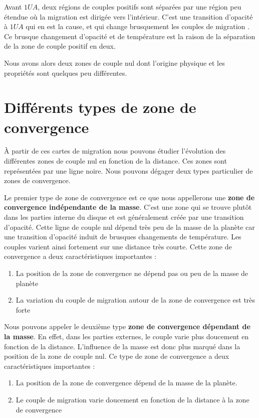 \bigskip

Avant $1\unit{UA}$, deux régions de couples positifs sont séparées par une région peu étendue où la migration est dirigée vers l'intérieur. C'est une transition d'opacité à $1\unit{UA}$ qui
en est la cause, et qui change brusquement les couples de migration . Ce
brusque changement d'opacité et de température est la raison de la séparation de la zone de couple positif en deux. 

Nous avons alors deux zones de couple nul dont l'origine physique et les propriétés sont quelques peu différentes. 

\section{Différents types de zone de convergence}\label{sec:CZ-types}
À partir de ces cartes de migration nous pouvons étudier l'évolution des différentes zones de couple nul en fonction de la
distance. Ces zones sont représentées par une ligne noire. Nous pouvons dégager deux types particulier de zones de convergence. 

Le premier type de zone de convergence est ce que nous appellerons une \textbf{zone de convergence indépendante de la masse}. C'est une
zone qui se trouve plutôt dans les parties interne du disque et est généralement créée par une transition d'opacité. Cette ligne de couple nul dépend très peu de la masse de la
planète car une transition d'opacité induit de brusques changements de température. Les couples varient ainsi fortement sur une
distance très courte. Cette zone de convergence a deux caractéristiques importantes : 
\begin{enumerate}
\item La position de la zone de convergence ne dépend pas ou peu de la masse de planète
\item La variation du couple de migration autour de la zone de convergence est très forte
\end{enumerate}

Nous pouvons appeler le deuxième type \textbf{zone de convergence dépendant de la masse}. En effet, dans les parties externes, le
couple varie plus doucement en fonction de la distance. L'influence de la masse est donc plus marqué dans la position de la zone
de couple nul. Ce type de zone de convergence a deux caractéristiques importantes : 
\begin{enumerate}
\item La position de la zone de convergence dépend de la masse de la planète. 
\item Le couple de migration varie doucement en fonction de la distance à la zone de convergence
\end{enumerate}

